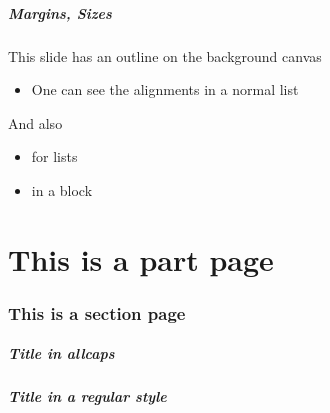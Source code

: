 \documentclass[
t, %
10pt, %
aspectratio=1610, %
ngerman,
english,
]{beamer}
\begin{document}
{
\begin{frame}
    \frametitle{Margins, Sizes}
    This slide has an outline on the background canvas
    \begin{itemize}
      \item One can see the alignments in a normal list
    \end{itemize}
    \begin{block}{And also}
      \begin{itemize}
        \item for lists
        \item in a block
      \end{itemize}
    \end{block}
\end{frame}
}

\subtitle{Now in text only mode and regular text}
\maketitle

\subtitle{Now back in image mode}
\maketitle

\part{This is a part page}
\makepart

\section{This is a section page}
\subtitle{This is a section page}
\makesection

\begin{frame}
\frametitle{Title in allcaps}
\end{frame}

\begin{frame}
\frametitle{Title in a regular style}
\end{frame}
\end{document}
